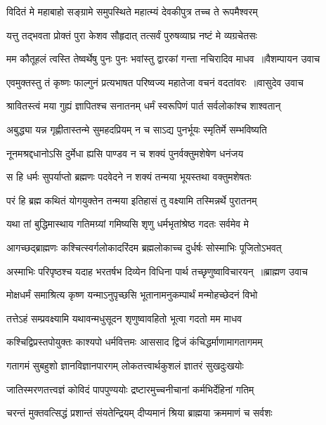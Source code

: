 \twolineshloka
{विदितं मे महाबाहो सङ्ग्रामे समुपस्थिते}
{महात्म्यं देवकीपुत्र तच्च ते रूपमैश्वरम्}


\twolineshloka
{यत्तु तद्भवता प्रोक्तं पुरा केशव सौहृदात्}
{तत्सर्वं पुरुषव्याघ्र नष्टं मे व्यग्रचेतसः}


\threelineshloka
{मम कौतूहलं त्वस्ति तेष्वर्थेषु पुनः पुनः}
{भवांस्तु द्वारकां गन्ता नचिरादिव माधव ॥वैशम्पायन उवाच}
{}


\threelineshloka
{एवमुक्तस्तु तं कृष्णः फाल्गुनं प्रत्यभाषत}
{परिष्वज्य महातेजा वचनं वदतांवरः ॥वासुदेव उवाच}
{}


\twolineshloka
{श्रावितस्त्वं मया गुह्यं ज्ञापितश्च सनातनम्}
{धर्मं स्वरूपिणं पार्त सर्वलोकांश्च शाश्वतान्}


\twolineshloka
{अबुद्ध्या यन्न गृह्णीतास्तन्मे सुमहदप्रियम्}
{न च साऽद्य पुनर्भूयः स्मृतिर्मे सम्भविष्यति}


\twolineshloka
{नूनमश्रद्दधानोऽसि दुर्मेधा ह्यसि पाण्डव}
{न च शक्यं पुनर्वक्तुमशेषेण धनंजय}


\twolineshloka
{स हि धर्मः सुपर्याप्तो ब्रह्मणः पदवेदने}
{न शक्यं तन्मया भूयस्तथा वक्तुमशेषतः}


\twolineshloka
{परं हि ब्रह्म कथितं योगयुक्तेन तन्मया}
{इतिहासं तु वक्ष्यामि तस्मिन्नर्थे पुरातनम्}


\twolineshloka
{यथा तां बुद्धिमास्थाय गतिमग्र्यां गमिष्यसि}
{शृणु धर्मभृतांश्रेष्ठ गदतः सर्वमेव मे}


\twolineshloka
{आगच्छद्ब्राह्मणः कश्चित्स्वर्गलोकादरिंदम}
{ब्रह्मलोकाच्च दुर्धर्षः सोस्माभिः पूजितोऽभवत्}


\threelineshloka
{अस्माभिः परिपृष्ठश्च यदाह भरतर्षभ}
{दिव्येन विधिना पार्थ तच्छृणुष्वाविचारयन् ॥ब्राह्मण उवाच}
{}


\twolineshloka
{मोक्षधर्मं समाश्रित्य कृष्ण यन्माऽनुपृच्छसि}
{भूतानामनुकम्पार्थं मन्मोहच्छेदनं विभो}


\twolineshloka
{तत्तेऽहं सम्प्रवक्ष्यामि यथावन्मधुसूदन}
{शृणुष्वावहितो भूत्वा गदतो मम माधव}


\twolineshloka
{कश्चिद्विप्रस्तपोयुक्तः काश्यपो धर्मवित्तमः}
{आससाद द्विजं कंचिद्धर्माणामागतागमम्}


\twolineshloka
{गतागमं सुबहुशो ज्ञानविज्ञानपारगम्}
{लोकतत्त्वार्थकुशलं ज्ञातरं सुखदुःखयोः}


\twolineshloka
{जातिस्मरणतत्त्वज्ञं कोविदं पापपुण्ययोः}
{द्रष्टारमुच्चनीचानां कर्मभिर्देहिनां गतिम्}


\twolineshloka
{चरन्तं मुक्तवत्सिद्धं प्रशान्तं संयतेन्द्रियम्}
{दीप्यमानं श्रिया ब्राह्मया क्रममाणं च सर्वशः}


